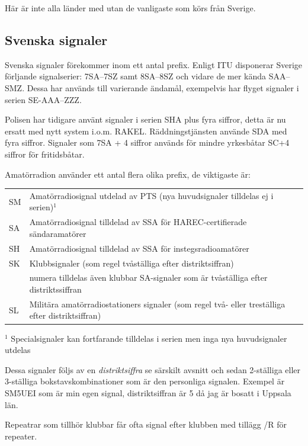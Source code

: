 Här är inte alla länder med utan de vanligaste som körs från Sverige.



\subsection{Svenska signaler}

Svenska signaler förekommer inom ett antal prefix. Enligt ITU disponerar
Sverige förljande signalserier: 7SA--7SZ samt 8SA--8SZ och vidare de mer kända
SAA--SMZ. Dessa har används till varierande ändamål, exempelvis har flyget
signaler i serien SE-AAA--ZZZ.

Polisen har tidigare använt signaler i serien SHA plus fyra siffror, detta är
nu ersatt med nytt system i.o.m. RAKEL. Räddningstjänsten använde SDA med fyra
siffror. Signaler som 7SA + 4 siffror används för mindre yrkesbåtar SC+4
siffror för fritidsbåtar.

Amatörradion använder ett antal flera olika prefix, de viktigaste är:

\begin{tabular}{ll}
	SM & Amatörradiosignal utdelad av PTS (nya huvudsignaler tilldelas ej i serien)$^1$                  \\
	SA & Amatörradiosignal tilldelad av SSA för HAREC-certifierade sändaramatörer                         \\
	SH & Amatörradiosignal tilldelad av SSA för instegsradioamatörer                                      \\
	SK & Klubbsignaler (som regel tvåställiga efter distriktsiffran)                                      \\
	   & numera tilldelas även klubbar SA-signaler som är tvåställiga efter distriktssiffran              \\
	SL & Militära amatörradiostationers signaler (som regel två- eller treställiga efter distriktsiffran)
\end{tabular}

$^1$ Specialsignaler kan fortfarande tilldelas i serien men inga nya huvudsignaler utdelas

Dessa signaler följs av en \textit{distriktsiffra} se särskilt avsnitt och
sedan 2-ställiga eller 3-ställiga bokstavskombinationer som är den personliga
signalen. Exempel är SM5UEI som är min egen signal, distriktsiffran är 5 då
jag är bosatt i Uppsala län.

Repeatrar som tillhör klubbar får ofta signal efter klubben med tillägg /R för
repeater.

